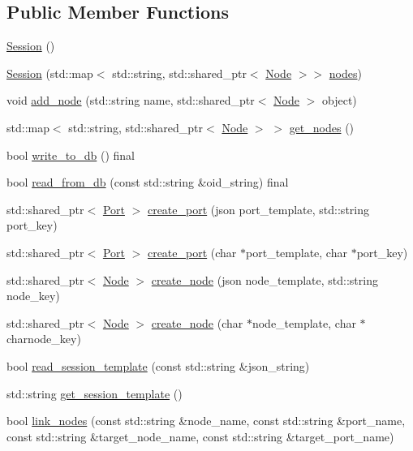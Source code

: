 \subsection*{Public Member Functions}
\begin{DoxyCompactItemize}
\item 
\hyperlink{class_session_ad92ef09b872c9227e38a6efdd4d8a837}{Session} ()
\item 
\hyperlink{class_session_a556c8971b03563ae3c94dc1d19cbed27}{Session} (std\+::map$<$ std\+::string, std\+::shared\+\_\+ptr$<$ \hyperlink{class_node}{Node} $>$$>$ \hyperlink{class_session_a0b50e79f5e66081dd5112571107bc652}{nodes})
\item 
void \hyperlink{class_session_a7b5d3b9db809cc54e515639b78b0e811}{add\+\_\+node} (std\+::string name, std\+::shared\+\_\+ptr$<$ \hyperlink{class_node}{Node} $>$ object)
\item 
std\+::map$<$ std\+::string, std\+::shared\+\_\+ptr$<$ \hyperlink{class_node}{Node} $>$ $>$ \hyperlink{class_session_af091cae3db4abcc5afe4a8abaef222f2}{get\+\_\+nodes} ()
\item 
bool \hyperlink{class_session_a513e5436b4c990985300246bb39d9f5c}{write\+\_\+to\+\_\+db} () final
\item 
bool \hyperlink{class_session_a4f09644fd155a1d5640cedefe4aa42fc}{read\+\_\+from\+\_\+db} (const std\+::string \&oid\+\_\+string) final
\item 
std\+::shared\+\_\+ptr$<$ \hyperlink{class_port}{Port} $>$ \hyperlink{class_session_abba77e16f30f13cb1b907066c672dd72}{create\+\_\+port} (json port\+\_\+template, std\+::string port\+\_\+key)
\item 
std\+::shared\+\_\+ptr$<$ \hyperlink{class_port}{Port} $>$ \hyperlink{class_session_ab9bee143899cc1eb3d3cf9dcb3652f99}{create\+\_\+port} (char $\ast$port\+\_\+template, char $\ast$port\+\_\+key)
\item 
std\+::shared\+\_\+ptr$<$ \hyperlink{class_node}{Node} $>$ \hyperlink{class_session_aa546642e267c2117abaee79025d6e1a8}{create\+\_\+node} (json node\+\_\+template, std\+::string node\+\_\+key)
\item 
std\+::shared\+\_\+ptr$<$ \hyperlink{class_node}{Node} $>$ \hyperlink{class_session_a4829a2015ef1ceaf78c49c953b54258e}{create\+\_\+node} (char $\ast$node\+\_\+template, char $\ast$charnode\+\_\+key)
\item 
bool \hyperlink{class_session_adb03e68fc271cf09c0175cb908b4afff}{read\+\_\+session\+\_\+template} (const std\+::string \&json\+\_\+string)
\item 
std\+::string \hyperlink{class_session_a7083c5cb94be76912b0fe02d003766be}{get\+\_\+session\+\_\+template} ()
\item 
bool \hyperlink{class_session_aa9b0d73252fbb01cab292ef6b425da12}{link\+\_\+nodes} (const std\+::string \&node\+\_\+name, const std\+::string \&port\+\_\+name, const std\+::string \&target\+\_\+node\+\_\+name, const std\+::string \&target\+\_\+port\+\_\+name)
\end{DoxyCompactItemize}
